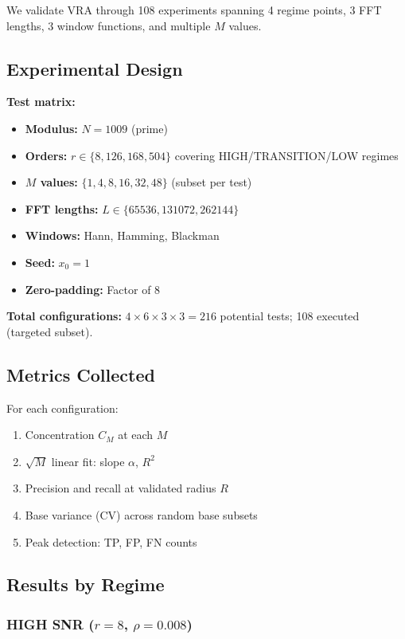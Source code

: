 We validate VRA through 108 experiments spanning 4 regime points, 3 FFT lengths, 3 window functions, and multiple $M$ values.

\subsection{Experimental Design}

\textbf{Test matrix:}
\begin{itemize}
    \item \textbf{Modulus:} $N = 1009$ (prime)
    \item \textbf{Orders:} $r \in \{8, 126, 168, 504\}$ covering HIGH/TRANSITION/LOW regimes
    \item \textbf{$M$ values:} $\{1, 4, 8, 16, 32, 48\}$ (subset per test)
    \item \textbf{FFT lengths:} $L \in \{65536, 131072, 262144\}$
    \item \textbf{Windows:} Hann, Hamming, Blackman
    \item \textbf{Seed:} $x_0 = 1$
    \item \textbf{Zero-padding:} Factor of 8
\end{itemize}

\textbf{Total configurations:} $4 \times 6 \times 3 \times 3 = 216$ potential tests; 108 executed (targeted subset).

\subsection{Metrics Collected}

For each configuration:
\begin{enumerate}
    \item Concentration $C_M$ at each $M$
    \item $\sqrt{M}$ linear fit: slope $\alpha$, $R^2$
    \item Precision and recall at validated radius $R$
    \item Base variance (CV) across random base subsets
    \item Peak detection: TP, FP, FN counts
\end{enumerate}

\subsection{Results by Regime}

\subsubsection{HIGH SNR ($r=8$, $\rho=0.008$)}

